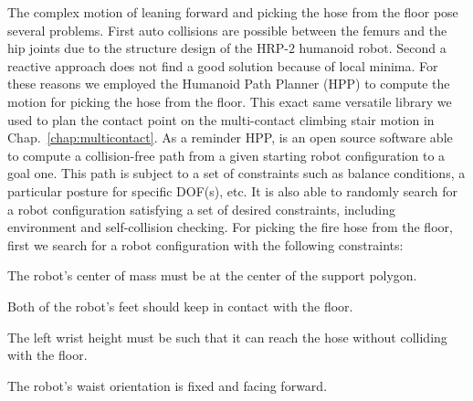 
The complex motion of leaning forward and picking the hose from the floor pose several problems.
%
First auto collisions are possible between the femurs and the hip joints due to the structure design of the HRP-$2$ humanoid robot.
%
Second a reactive approach does not find a good solution because of local minima.
%
For these reasons we employed the Humanoid Path Planner (HPP) to compute the motion for picking the hose from the floor.
%
This exact same versatile library we used to plan the contact point on the multi-contact climbing stair motion in Chap.~\ref{chap:multicontact}.
%
As a reminder HPP, \cite{hpp} is an open source software able to compute a collision-free path from a given starting robot configuration to a goal one.
%
This path is subject to a set of constraints such as balance conditions, a particular posture for specific DOF(s), etc.
%
It is also able to randomly search for a robot configuration satisfying a set of desired constraints, including environment and self-collision checking.
%
For picking the fire hose from the floor, first we search for a robot configuration with the following constraints:
%
\vspace{0.7mm}
\begin{list}{.}{%
		\setlength{\topsep}{2pt}%
		\setlength{\itemsep}{0pt}%
		\setlength{\parsep}{0pt}%
		\setlength{\labelwidth}{1.5em}%
		\setlength{\leftmargin}{1.5em}%
		\setlength{\labelsep}{0.5em}%
	}
%
\item The robot's center of mass must be at the center of the support polygon.
%
\item Both of the robot's feet should keep in contact with the floor.
%
\item The left wrist height must be such that it can reach the hose without colliding with the floor.
%
\item The robot's waist orientation is fixed and facing forward.
%
\end{list}


